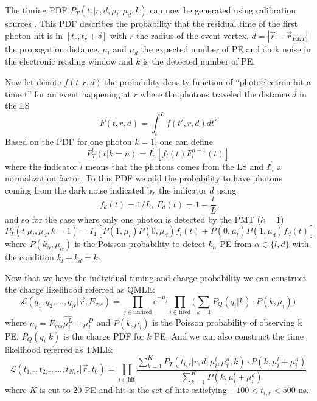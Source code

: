 \documentclass[../main.tex]{subfiles}
\begin{document}
The timing PDF $P_T(t_r | r,d,\mu_l,\mu_d,k)$ can now be generated using calibration sources \cite{huang_data-driven_2023}. This PDF describes the probability that the residual time of the first photon hit is in $[t_r, t_r + \delta]$ with $r$ the radius of the event vertex, $d = |\vec{r} - \vec{r}_{PMT}|$ the propagation distance, $\mu_l$ and $\mu_d$ the expected number of PE and dark noise in the electronic reading window and $k$ is the detected number of PE.

Now let denote $f(t, r, d)$ the probability density function of ``photoelectron hit a time t'' for an event happening at $r$ where the photons traveled the distance $d$ in the LS
\begin{equation}
  F(t, r, d) = \int_t^L f(t', r, d)dt'
\end{equation}
Based on the PDF for one photon $k=1$, one can define
\begin{equation}
  P^l_T(t|k=n) = I^l_n [f_l(t)F^{n-1}_l(t)]
\end{equation}
where the indicator $l$ means that the photons comes from the LS and $I^l_n$ a normalization factor. To this PDF we add the probability to have photons coming from the dark noise indicated by the indicator $d$ using
\begin{equation}
  f_d(t) = 1 / L, ~ F_d(t) = 1 - \frac{t}{L}
\end{equation}
and so for the case where only one photon is detected by the PMT ($k=1$)
\begin{equation}
  P_T(t|\mu_l, \mu_d, k = 1) = I_1 [ P(1, \mu_l) P(0, \mu_d) f_l(t) + P(0, \mu_l) P(1, \mu_d) f_d(t) ]
\end{equation}
where $P(k_\alpha, \mu_\alpha)$ is the Poisson probability to detect $k_\alpha$ PE from $\alpha \in \{l, d\}$ with the condition $k_l + k_d = k$.

Now that we have the individual timing and charge probability we can construct the charge likelihood referred as QMLE:
\begin{equation}
  \mathcal{L}(q_1, q_2, ..., q_N | \vec{r}, E_{vis}) = \prod_{j \in \mathrm{unfired}} e^{-\mu_j} \prod_{i \in \mathrm{fired}} \bigg(\sum_{k=1} P_Q(q_i|k) \cdot P(k, \mu_i) \bigg)
\end{equation}
where $\mu_i = E_{vis} \hat{\mu_i^L} + \mu_i^D$ and $P(k, \mu_i)$ is the Poisson probability of observing k PE. $P_Q(q_i|k)$ is the charge PDF for $k$ PE. And we can also construct the time likelihood referred as TMLE:
\begin{equation}
  \mathcal{L}(t_{1,r}, t_{2,r}, ..., t_{N,r} | \vec{r}, t_0) = \prod_{i \in \mathrm{hit}} \frac{\sum_{k=1}^K P_T(t_{i,r} | r, d, \mu_i^l, \mu_i^d, k) \cdot P(k, \mu^l_i + \mu^d_i)}{\sum_{k=1}^K P(k, \mu^l_i + \mu^d_i)}
\end{equation}
where $K$ is cut to 20 PE and hit is the set of hits satisfying $-100 < t_{i,r} < 500$ ns.
\end{document}
